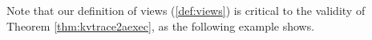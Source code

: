 


Note that our definition of views (\cref{def:views}) is critical to the validity of Theorem \ref{thm:kvtrace2aexec}, 
as the following example shows. 

